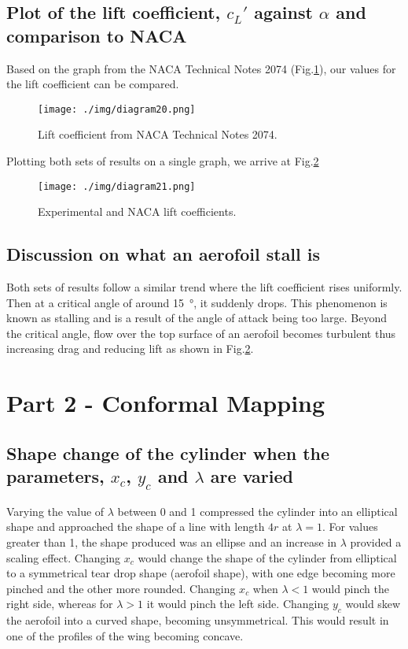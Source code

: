\subsection{Plot of the lift coefficient, $c_L'$ against $\alpha$ and comparison to NACA}
Based on the graph from the NACA Technical Notes 2074 (Fig.\ref{nacagraph}), our values for the lift coefficient can be compared.
\begin{figure}[H]
    \centering
    \texttt{[image: ./img/diagram20.png]}
    \caption{Lift coefficient from NACA Technical Notes 2074.}
    \label{nacagraph}
\end{figure}
Plotting both sets of results on a single graph, we arrive at Fig.\ref{liftcoeffgraphs}
\begin{figure}[H]
    \centering
    \texttt{[image: ./img/diagram21.png]}
    \caption{Experimental and NACA lift coefficients.}
    \label{liftcoeffgraphs}
\end{figure}
\subsection{Discussion on what an aerofoil stall is}
Both sets of results follow a similar trend where the lift coefficient rises uniformly. Then at a critical angle of around \SI{15}{\degree}, it suddenly drops. This phenomenon is known as stalling and is a result of the angle of attack being too large. Beyond the critical angle, flow over the top surface of an aerofoil becomes turbulent thus increasing drag and reducing lift as shown in Fig.\ref{liftcoeffgraphs}.
\section{Part 2 - Conformal Mapping}
\subsection{Shape change of the cylinder when the parameters, $x_c$, $y_c$ and $\lambda$ are varied}
Varying the value of $\lambda$ between 0 and 1 compressed the cylinder into an elliptical shape and approached the shape of a line with length $4r$ at $\lambda = 1$. For values greater than 1, the shape produced was an ellipse and an increase in $\lambda$ provided a scaling effect. Changing $x_c$ would change the shape of the cylinder from elliptical to a symmetrical tear drop shape (aerofoil shape), with one edge becoming more pinched and the other more rounded. Changing $x_c$ when $\lambda < 1$ would pinch the right side, whereas for $\lambda >1$ it would pinch the left side. Changing $y_c$ would skew the aerofoil into a curved shape, becoming unsymmetrical. This would result in one of the profiles of the wing becoming concave.
